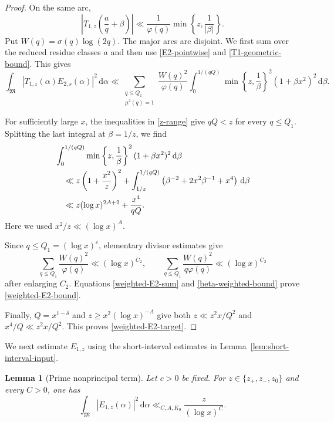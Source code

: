 \documentclass[12pt,reqno]{amsart}
\numberwithin{equation}{section}
\theoremstyle{plain}
\newtheorem{lemma}[theorem]{Lemma}
\theoremstyle{remark}
\newcommand{\dif}{\mathrm{d}}
\newcommand{\majorarc}{\mathfrak{M}}
\begin{document}
\begin{proof}
On the same arc,
\begin{equation}\label{T1-geometric-bound}
 \left|T_{1,z}\left(\frac aq+\beta\right)\right|
 \ll
 \frac1{\varphi(q)}
 \min\left\{z,\frac1{|\beta|}\right\}.
\end{equation}
Put $W(q)=\sigma(q)\log(2q)$.
The major arcs are disjoint.
We first sum over the reduced residue classes $a$ and then use
\eqref{E2-pointwise} and \eqref{T1-geometric-bound}.
This gives
\begin{equation}
 \int_{\majorarc}
 |T_{1,z}(\alpha)E_{2,s}(\alpha)|^2\,\dif\alpha
\ll
 \sum_{\substack{q\leq Q_1\\\mu^2(q)=1}}
 \frac{W(q)^2}{\varphi(q)}
 \int_0^{1/(qQ)}
 \min\left\{z,\frac1\beta\right\}^2
 (1+\beta x^2)^2\,\dif\beta.
\label{weighted-E2-sum}
\end{equation}

For sufficiently large $x$, the inequalities in \eqref{z-range} give
$qQ<z$ for every $q\leq Q_1$.
Splitting the last integral at $\beta=1/z$, we find
\begin{align}
 &\int_0^{1/(qQ)}
 \min\left\{z,\frac1\beta\right\}^2
 (1+\beta x^2)^2\,\dif\beta\notag\\
 &\quad\ll
 z\left(1+\frac{x^2}{z}\right)^2
 +\int_{1/z}^{1/(qQ)}
\left(\beta^{-2}+2x^2\beta^{-1}+x^4\right)\,\dif\beta\notag\\
 &\quad\ll
 z(\log x)^{2A+2}+\frac{x^4}{qQ}.
\label{beta-weighted-bound}
\end{align}
Here we used $x^2/z\ll(\log x)^A$.

Since $q\leq Q_1=(\log x)^c$, elementary divisor estimates give
\[
 \sum_{q\leq Q_1}\frac{W(q)^2}{\varphi(q)}
 \ll(\log x)^{C_2},
 \qquad
 \sum_{q\leq Q_1}\frac{W(q)^2}{q\varphi(q)}
 \ll(\log x)^{C_2}
\]
after enlarging $C_2$.
Equations \eqref{weighted-E2-sum} and \eqref{beta-weighted-bound} prove \eqref{weighted-E2-bound}.

Finally, $Q=x^{1-\delta}$ and $z\geq x^2(\log x)^{-A}$ give both
$z\ll z^2x/Q^2$ and $x^4/Q\ll z^2x/Q^2$.  This proves
\eqref{weighted-E2-target}.
\end{proof}

We next estimate $E_{1,z}$ using the short-interval estimates in
Lemma~\ref{lem:short-interval-input}.

\begin{lemma}[Prime nonprincipal term]\label{lem:E1}
Let $c>0$ be fixed. For $z\in\{z_+,z_-,z_0\}$ and every $C>0$, one has
\begin{equation}\label{E1-bound}
 \int_{\majorarc}|E_{1,z}(\alpha)|^2\,\dif\alpha
 \ll_{C,A,K_0}\frac z{(\log x)^C}.
\end{equation}
\end{lemma}
\end{document}

